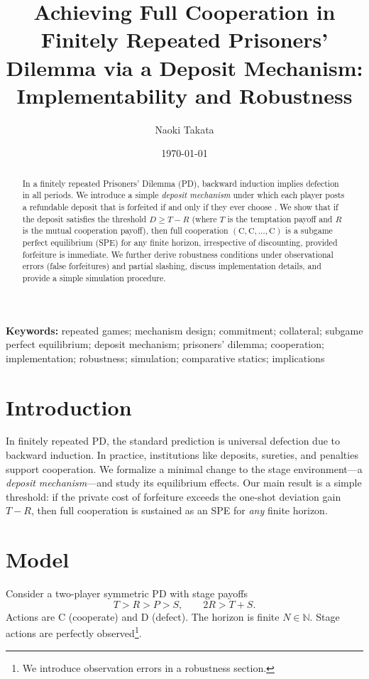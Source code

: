 \documentclass[a4paper,11pt]{article}
\title{Achieving Full Cooperation in Finitely Repeated Prisoners' Dilemma via a Deposit Mechanism: Implementability and Robustness}
\author{Naoki Takata}
\date{\today}
\theoremstyle{definition}
\theoremstyle{plain}
\theoremstyle{remark}
\newcommand{\C}{\text{C}} %
\newcommand{\D}{\text{D}} %
\newcommand{\1}{\mathbf{1}}
\begin{document}
\maketitle

\begin{abstract}
In a finitely repeated Prisoners' Dilemma (PD), backward induction implies defection in all periods.
We introduce a simple \emph{deposit mechanism} under which each player posts a refundable deposit that is forfeited if and only if they ever choose \D. 
We show that if the deposit satisfies the threshold $D \ge T-R$ (where $T$ is the temptation payoff and $R$ is the mutual cooperation payoff), then full cooperation $(\C,\C,\ldots,\C)$ is a subgame perfect equilibrium (SPE) for any finite horizon, irrespective of discounting, provided forfeiture is immediate. 
We further derive robustness conditions under observational errors (false forfeitures) and partial slashing, discuss implementation details, and provide a simple simulation procedure.
\end{abstract}

\noindent\textbf{Keywords:} repeated games; mechanism design; commitment; collateral; subgame perfect equilibrium; deposit mechanism; prisoners' dilemma; cooperation; implementation; robustness; simulation; comparative statics; implications

\section{Introduction}
In finitely repeated PD, the standard prediction is universal defection due to backward induction.
In practice, institutions like deposits, sureties, and penalties support cooperation.
We formalize a minimal change to the stage environment---a \emph{deposit mechanism}---and study its equilibrium effects.
Our main result is a simple threshold: if the private cost of forfeiture exceeds the one-shot deviation gain $T-R$, then full cooperation is sustained as an SPE for \emph{any} finite horizon.

\section{Model}
Consider a two-player symmetric PD with stage payoffs
\[
T>R>P>S,\qquad 2R > T+S.
\]
Actions are $\C$ (cooperate) and $\D$ (defect). The horizon is finite $N\in\mathbb{N}$. 
Stage actions are perfectly observed\footnote{We introduce observation errors in a robustness section.}.
\end{document}
